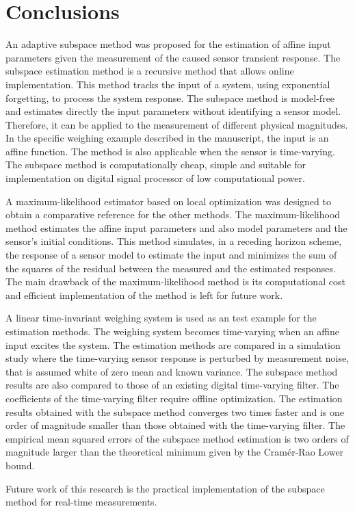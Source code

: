 \section{Conclusions}

An adaptive subspace method was proposed for the estimation of affine input parameters given the measurement of the caused sensor transient response. 
The subspace estimation method is a recursive method that allows online implementation.
This method tracks the input of a system, using exponential forgetting, to process the system response.
The subspace method is model-free and estimates directly the input parameters without identifying a sensor model.
Therefore, it can be applied to the measurement of different physical magnitudes.
In the specific weighing example described in the manuscript, the input is an affine function.
The method is also applicable when the sensor is time-varying.
The subspace method is computationally cheap, simple and suitable for implementation on digital signal processor of low computational power. 

A maximum-likelihood estimator based on local optimization was designed to obtain a comparative reference for the other methods.
The maximum-likelihood method estimates the affine input parameters and also model parameters and the sensor's initial conditions.
This method simulates, in a receding horizon scheme, the response of a sensor model to estimate the input and minimizes the sum of the squares of the residual between the measured and the estimated responses.
The main drawback of the maximum-likelihood method is its computational cost and efficient implementation of the method is left for future work.

A linear time-invariant weighing system is used as an test example for the estimation methods.
The weighing system becomes time-varying when an affine input excites the system.
The estimation methods are compared in a simulation study where the time-varying sensor response is perturbed by measurement noise, that is assumed white of zero mean and known variance.
The subspace method results are also compared to those of an existing digital time-varying filter.
The coefficients of the time-varying filter require offline optimization.
The estimation results obtained with the subspace method converges two times faster and is one order of magnitude smaller than those obtained with the time-varying filter.
The empirical mean squared errors of the subspace method estimation is two orders of magnitude larger than the theoretical minimum given by the Cram\'er-Rao Lower bound.

Future work of this research is the practical implementation of the subspace method for real-time measurements.

\newpage
